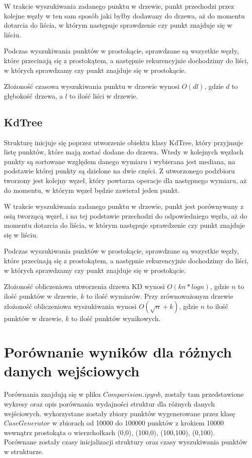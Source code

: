 \documentclass{lab}
\begin{document}
W trakcie wyszukiwania zadanego punktu w drzewie, punkt przechodzi przez kolejne węzły w ten sam sposób jaki byłby dodawany do drzewa, aż do momentu dotarcia do liścia,
w którym następuje sprawdzenie czy punkt znajduje się w liściu.

Podczas wyszukiwania punktów w prostokącie, sprawdzane są wszystkie węzły, które przecinają się z prostokątem, a następnie rekurencyjnie dochodzimy do liści,
w których sprawdzamy czy punkt znajduje się w prostokącie.

Złożoność czasowa wyszukiwania punktu w drzewie wynosi $O(dl)$, gdzie $d$ to głębokość drzewa, a $l$ to ilość liści w drzewie.

\subsection{KdTree}
Strukturę inicjuje się poprzez utworzenie obiektu klasy KdTree, który przyjmuje listę punktów, które mają zostać dodane do drzewa.
Wtedy w kolejnych węzłach punkty są sortowane względem danego wymiaru i wybierana jest mediana, na podstawie której punkty są dzielone na dwie części.
Z utworzonego podzbioru tworzony jest kolejny węzeł, który powtarza operacje dla następnego wymiaru, aż do momentu, w którym węzeł będzie zawierał jeden punkt.

W trakcie wyszukiwania zadanego punktu w drzewie, punkt jest porównywany z osią tworzącą węzeł, i na tej podstawie przechodzi do odpowiedniego węzła,
aż do momentu dotarcia do liścia, w którym następuje sprawdzenie czy punkt znajduje się w liściu.

Podczas wyszukiwania punktów w prostokącie, sprawdzane są wszystkie węzły, które przecinają się z prostokątem, a następnie rekurencyjnie dochodzimy do liści,
w których sprawdzamy czy punkt znajduje się w prostokącie.

Złożoność obliczeniowa utworzenia drzewa KD wynosi $O(kn*logn)$, gdzie $n$ to ilość punktów w drzewie, $k$ to ilość wymiarów. Przy zrównoważonym drzewie złożoność obliczeniowa wyszukiwania wynosi $O(\sqrt{n}+k)$, gdzie $n$ to ilość punktów w drzewie, $k$ to ilość punktów wynikowych.

\section{Porównanie wyników dla różnych danych wejściowych}
Porównania znajdują się w pliku $Comparision.ipynb$, zostały tam przedstawione wykresy oraz opis porównania wydajności struktur dla różnych danych wejściowych.
wykorzystane zostały zbiory punktów wygenerowane przez klasę $CaseGenerator$ w zbiorach od 10000 do 100000 punktów z krokiem 10000 wewnątrz prostokąta o wierzchołkach (0,0), (100,0), (100,100), (0,100).
Porównane zostały czasy inicjalizacji struktury oraz czasy wyszukiwania punktów w strukturze.
\end{document}

